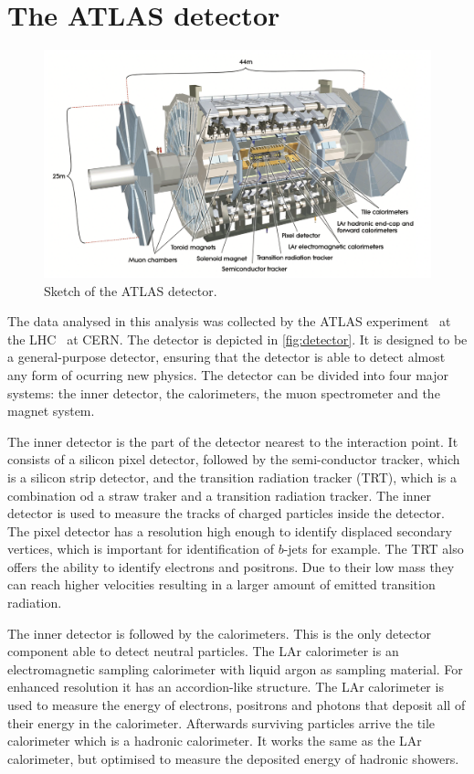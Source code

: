 \section{The ATLAS detector}

\begin{figure}[tb]
  \centering
  \includegraphics[width=.8\textwidth]{graphics/detector.png}
  \caption{Sketch of the ATLAS detector. \cite{ATLAS}}
  \label{fig:detector}
\end{figure}

The data analysed in this analysis was collected by the ATLAS experiment~\cite{ATLAS} at the LHC~\cite{LHC} at CERN. The detector is depicted in \autoref{fig:detector}. It is designed to be a general-purpose detector, ensuring that the detector is able to detect almost any form of ocurring new physics. The detector can be divided into four major systems: the inner detector, the calorimeters, the muon spectrometer and the magnet system.

The inner detector is the part of the detector nearest to the interaction point. It consists of a silicon pixel detector, followed by the semi-conductor tracker, which is a silicon strip detector, and the transition radiation tracker (TRT), which is a combination od a straw traker and a transition radiation tracker. The inner detector is used to measure the tracks of charged particles inside the detector. The pixel detector has a resolution high enough to identify displaced secondary vertices, which is important for identification of $b$-jets for example. The TRT also offers the ability to identify electrons and positrons. Due to their low mass they can reach higher velocities resulting in a larger amount of emitted transition radiation.

The inner detector is followed by the calorimeters. This is the only detector component able to detect neutral particles.
The LAr calorimeter is an electromagnetic sampling calorimeter with liquid argon as sampling material. For enhanced resolution it has an accordion-like structure. The LAr calorimeter is used to measure the energy of electrons, positrons and photons that deposit all of their energy in the calorimeter.
Afterwards surviving particles arrive the tile calorimeter which is a hadronic calorimeter. It works the same as the LAr calorimeter, but optimised to measure the deposited energy of hadronic showers.

